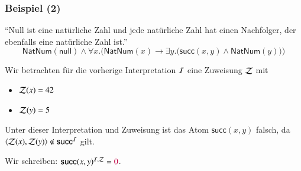 \documentclass[aspectratio=1610,onlymath]{beamer}
\begin{document}
\begin{frame}[t]\frametitle{Beispiel (2)}

\alert{"`Null ist eine natürliche Zahl und jede natürliche Zahl hat einen Nachfolger, der
ebenfalls eine natürliche Zahl ist."'}
\[ \textsf{NatNum}(\textsf{null})\wedge \forall x.\Big(\textsf{NatNum}(x)\to\exists y.\big(\textsf{succ}(x,y)\wedge \textsf{NatNum}(y)\big)\Big)\]

Wir betrachten für die vorherige Interpretation $\mathcal{I}$ 
eine Zuweisung $\mathcal{Z}$ mit
\begin{itemize}
\item $\mathcal{Z}(x)=42$
\item $\mathcal{Z}(y)=5$
\end{itemize}

Unter dieser Interpretation und Zuweisung ist das Atom $\textsf{succ}(x,y)$ falsch, da
$\langle{\mathcal{Z}(x),\mathcal{Z}(y)}\rangle\notin\textsf{succ}^{\mathcal{I}}$ gilt.
\smallskip

Wir schreiben: $\textsf{succ}(x,y)^{\mathcal{I},\mathcal{Z}}=\textcolor{purple}{0}$.
\bigskip


\end{frame}
\end{document}

